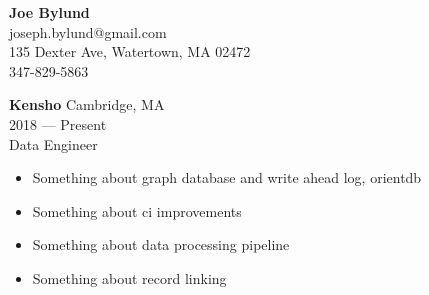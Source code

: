 
\begin{center}
\myfontsize{\bigheader}
\textbf{Joe Bylund}\\
\myfontsize{\bodysize}
joseph.bylund@gmail.com\\
135 Dexter Ave, Watertown, MA 02472\\
347-829-5863\hspace{3ex}\\
\end{center}

\hrulefill
\vspace{\littleskip}





\myfontsize{\bigheader}
\textbf{Kensho}
\myfontsize{\bodysize}
Cambridge, MA\\
2018 --- Present\\
Data Engineer\\

\begin{itemize}[topsep=1ex, partopsep=0ex, parsep=0ex, itemsep=0.5ex]
    \item Something about graph database and write ahead log, orientdb
    \item Something about ci improvements
    \item Something about data processing pipeline
    \item Something about record linking
\end{itemize}

